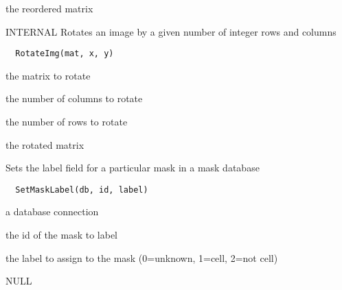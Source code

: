 \documentclass[a4paper]{book}
\begin{document}
%
\begin{Value}
the reordered matrix
\end{Value}
%
\begin{Description}\relax
INTERNAL Rotates an image by a given number of integer
rows and columns
\end{Description}
%
\begin{Usage}
\begin{verbatim}
  RotateImg(mat, x, y)
\end{verbatim}
\end{Usage}
%
\begin{Arguments}
\begin{ldescription}
\item[\code{mat}] the matrix to rotate

\item[\code{x}] the number of columns to rotate

\item[\code{y}] the number of rows to rotate
\end{ldescription}
\end{Arguments}
%
\begin{Value}
the rotated matrix
\end{Value}
%
\begin{Description}\relax
Sets the label field for a particular mask in a mask
database
\end{Description}
%
\begin{Usage}
\begin{verbatim}
  SetMaskLabel(db, id, label)
\end{verbatim}
\end{Usage}
%
\begin{Arguments}
\begin{ldescription}
\item[\code{db}] a database connection

\item[\code{id}] the id of the mask to label

\item[\code{label}] the label to assign to the mask (0=unknown,
1=cell, 2=not cell)
\end{ldescription}
\end{Arguments}
%
\begin{Value}
NULL
\end{Value}
\end{document}
